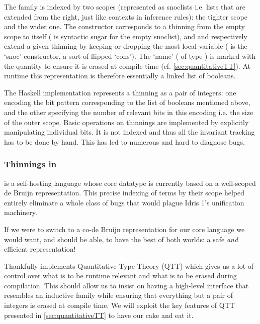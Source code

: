 %
The  family is indexed by two scopes (represented as snoclists
i.e. lists that are extended from the right, just like contexts in inference rules):
 the tighter scope and  the wider one.
%
The  constructor corresponds to a thinning from the empty scope to
itself (\IdrisData{[<]} is \idris{} syntactic sugar for the empty snoclist),
and  and  respectively extend a given thinning
by keeping or dropping the most local variable (\IdrisData{:<} is the `snoc'
constructor, a sort of flipped `cons').
%
The `name' ( of type ) is marked with the quantity
 to ensure it is erased at compile time (cf. \cref{sec:quantitativeTT}).
%
At runtime this representation is therefore essentially a linked list of booleans.

The Haskell implementation represents a thinning as a pair of integers: one encoding
the bit pattern corresponding to the list of booleans mentioned above, and the other
specifying the number of relevant bits in this encoding i.e. the size of the outer scope.
%
Basic operations on thinnings are implemented by explicitly manipulating individual bits.
%
It is not indexed and thus all the invariant tracking has to be done by hand.
This has led to numerous and hard to diagnose bugs.

\subsubsection{Thinnings in \idris}

\idris{} is a self-hosting language whose core datatype is currently based on
a well-scoped de Bruijn representation.
%
This precise indexing of terms by their scope helped entirely eliminate a whole
class of bugs that would plague Idris 1's unification machinery.

If we were to switch to a co-de Bruijn representation for our core language we
would want, and should be able, to have the best of both worlds:
a safe \emph{and} efficient representation!

Thankfully \idris{} implements Quantitative Type Theory (QTT) which gives us a
lot of control over what is to be runtime relevant and what is to be erased
during compilation.
%
This should allow us to insist on having a high-level interface that resembles
an inductive family while ensuring that everything but a pair of integers is erased
at compile time.
%
We will exploit the key features of QTT presented in \cref{sec:quantitativeTT}
to have our cake and eat it.
